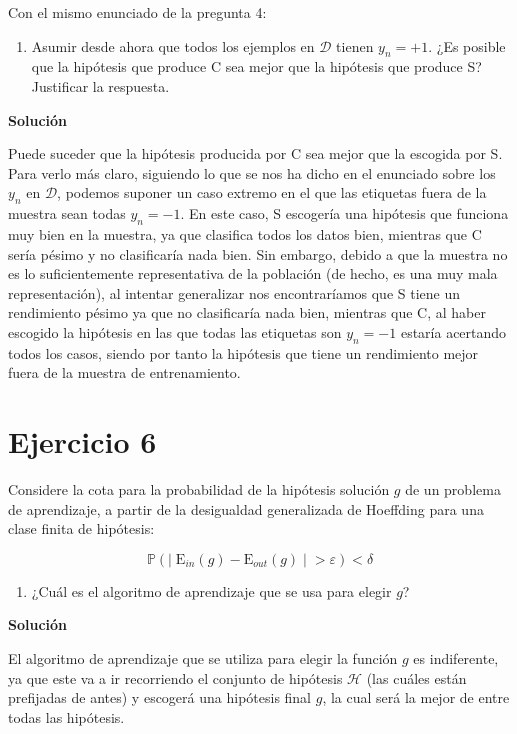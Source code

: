 \documentclass[11pt,a4paper]{article}
\newcommand{\answer}{\noindent\textbf{Solución}}
\newcommand{\addtoc}[1]{\addcontentsline{toc}{section}{#1}}
\begin{document}
\noindent Con el mismo enunciado de la pregunta 4:

\begin{enumerate}[label=\textit{\alph*})]
	\item Asumir desde ahora que todos los ejemplos en $\mathcal{D}$ tienen $y_n = +1$. ¿Es posible que
	la hipótesis que produce C sea mejor que la hipótesis que produce S? Justificar la respuesta.
\end{enumerate}

\answer

Puede suceder que la hipótesis producida por C sea mejor que la escogida por S. Para verlo más claro, siguiendo lo que
se nos ha dicho en el enunciado sobre los $y_n$ en $\mathcal{D}$, podemos suponer un caso extremo en el que las etiquetas
fuera de la muestra sean todas $y_n = -1$. En este caso, S escogería una hipótesis que funciona muy bien en la muestra,
ya que clasifica todos los datos bien, mientras que C sería pésimo y no clasificaría nada bien. Sin embargo, debido
a que la muestra no es lo suficientemente representativa de la población (de hecho, es una muy mala representación),
al intentar generalizar nos encontraríamos que S tiene un rendimiento pésimo ya que no clasificaría nada bien, 
mientras que C, al haber escogido la hipótesis en las que todas las etiquetas son $y_n = -1$ estaría acertando todos los
casos, siendo por tanto la hipótesis que tiene un rendimiento mejor fuera de la muestra de entrenamiento.


\section*{Ejercicio 6}
\addtoc{Ejercicio 6}

\noindent Considere la cota para la probabilidad de la hipótesis solución $g$ de un problema de aprendizaje, a partir de la
desigualdad generalizada de Hoeffding para una clase finita de hipótesis:

\[\mathbb{P}(  | \; \text{E}_{in}(g) - \text{E}_{out}(g) \; | \; > \varepsilon) < \delta \]

\begin{enumerate}[label=\textit{\alph*})]
	\item ¿Cuál es el algoritmo de aprendizaje que se usa para elegir $g$?
\end{enumerate}

\answer

El algoritmo de aprendizaje que se utiliza para elegir la función $g$ es indiferente, ya que este va a ir recorriendo el
conjunto de hipótesis $\mathcal{H}$ (las cuáles están prefijadas de antes) y escogerá una hipótesis final $g$, la cual
será la mejor de entre todas las hipótesis.
\end{document}
